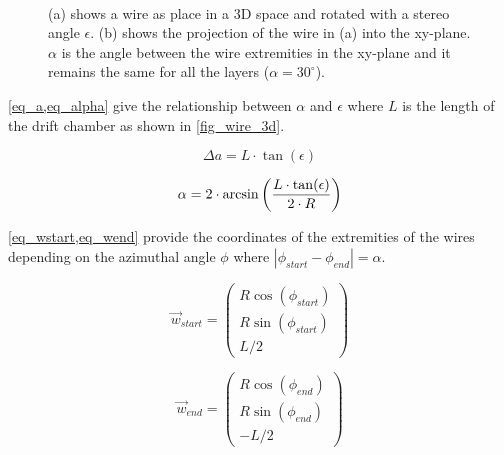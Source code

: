 \begin{figure}[ht]
\begin{subfigure}[b]{0.49\textwidth}
     \caption{}
     \label{fig_wire_2d}
  \end{subfigure}~
	\caption{(a) shows a wire as place in a 3D space and rotated with a stereo angle $\epsilon$. (b) shows the projection of the wire in (a) into the xy-plane. $\alpha$ is the angle between the wire extremities in the xy-plane and it remains the same for all the layers ($\alpha = 30^{\circ}$).}
	\label{wires_dch}
\end{figure}

\cref{eq_a,eq_alpha} give the relationship between $\alpha$ and $\epsilon$ where $L$ is the length of the drift chamber as shown in \cref{fig_wire_3d}.



\begin{equation}
  \Delta a = L \cdot \tan(\epsilon)
  \label{eq_a}
\end{equation}


\begin{equation}
  \alpha = 2 \cdot \arcsin\left({{L \cdot \tan(\epsilon)} \over {2
        \cdot R}}\right)
    \label{eq_alpha}
\end{equation}

\cref{eq_wstart,eq_wend} provide the coordinates of the extremities of the wires depending on the azimuthal angle $\phi$ where $\left|\phi_{start}-\phi_{end}\right| = \alpha$.

\begin{equation}
  \vec{w}_{start} = \begin{pmatrix}
    R \cos(\phi_{start}) \\
    R \sin(\phi_{start}) \\
    L/2
  \end{pmatrix}
  \label{eq_wstart}
\end{equation}

\begin{equation}
  \vec{w}_{end} = \begin{pmatrix}
    R \cos(\phi_{end}) \\
    R \sin(\phi_{end}) \\
    -L/2
  \end{pmatrix}
  \label{eq_wend}
\end{equation}
